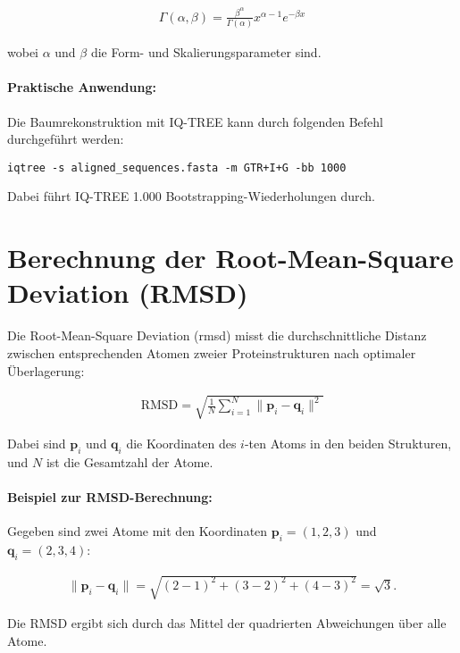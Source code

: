 \begin{align}
    \Gamma(\alpha, \beta) = \frac{\beta^\alpha}{\Gamma(\alpha)} x^{\alpha - 1} e^{-\beta x}
\end{align}

wobei $\alpha$ und $\beta$ die Form- und Skalierungsparameter sind.

\paragraph{Praktische Anwendung:}
Die Baumrekonstruktion mit IQ-TREE kann durch folgenden Befehl durchgeführt werden:
\begin{verbatim}
iqtree -s aligned_sequences.fasta -m GTR+I+G -bb 1000
\end{verbatim}
Dabei führt IQ-TREE 1.000 Bootstrapping-Wiederholungen durch.

\section{Berechnung der Root-Mean-Square Deviation (RMSD)} \label{sec:rmsd-berechnung}

Die Root-Mean-Square Deviation (\gls{rmsd}) misst die durchschnittliche Distanz zwischen entsprechenden Atomen zweier Proteinstrukturen nach optimaler Überlagerung:

\begin{align}
    \text{RMSD} = \sqrt{\frac{1}{N} \sum_{i=1}^N \| \mathbf{p}_i - \mathbf{q}_i \|^2}
\end{align}

Dabei sind $\mathbf{p}_i$ und $\mathbf{q}_i$ die Koordinaten des $i$-ten Atoms in den beiden Strukturen, und $N$ ist die Gesamtzahl der Atome.

\paragraph{Beispiel zur RMSD-Berechnung:}
Gegeben sind zwei Atome mit den Koordinaten $\mathbf{p}_i = (1, 2, 3)$ und $\mathbf{q}_i = (2, 3, 4)$:

\begin{align}
    \| \mathbf{p}_i - \mathbf{q}_i \| = \sqrt{(2-1)^2 + (3-2)^2 + (4-3)^2} = \sqrt{3}.
\end{align}

Die RMSD ergibt sich durch das Mittel der quadrierten Abweichungen über alle Atome.